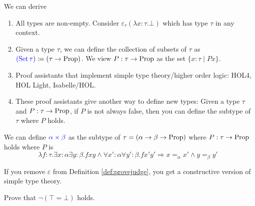 \begin{boxlem}
    We can derive
    \begin{prooftree}
    \end{prooftree}
\end{boxlem}

\begin{rem}
    \hfill
    \begin{enumerate}
        \item {All types are non-empty.
            Consider $\varepsilon_\tau(\lambda x : \tau. \bot)$ which has type $\tau$ in any context.}
        \item {Given a type $\tau$, we can define the collection of subsets of $\tau$ as $\alert{(\set \tau)} \coloneq (\tau \to \proptype)$.
        We view $P : \tau \to \proptype$ as the set $\{ x : \tau \mid P x\}$.}
        \item {Proof assistants that implement simple type theory/higher order logic: HOL4, HOL Light, Isabelle/HOL.}
        \item {These proof assistants give another way to define new types:
            Given a type $\tau$ and $P : \tau \to \proptype$, if $P$ is not always false, then you can define the subtype of $\tau$ where $P$ holds.}
    \end{enumerate}
\end{rem}

\begin{example}
    We can define $\alert{\alpha \times \beta}$ as the subtype of $\tau = (\alpha \to \beta \to \proptype)$ where $P : \tau \to \proptype$ holds where $P$ is
    \begin{equation*}
        \lambda f : \tau. \exists x : \alpha \exists y : \beta. f x y \wedge \forall x' : \alpha \forall y' : \beta. f x' y' \Rightarrow x \mathrel{=_\alpha} x' \wedge y \mathrel{=_\beta} y'
    \end{equation*}
\end{example}

\begin{rem}
    If you remove $\varepsilon$ from Definition \ref{def:provejudge}, you get a constructive version of simple type theory.
\end{rem}

\begin{exercise}\label{exe:topnebot}
    Prove that $\neg(\top = \bot)$ holds.
\end{exercise}

